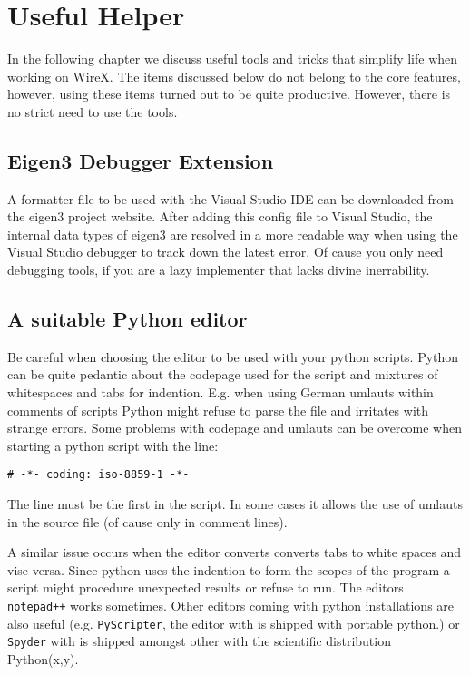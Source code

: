 \documentclass[11pt,a4paper,onepage,openany]{book}
\begin{document}
\chapter{Useful Helper}
In the following chapter we discuss useful tools and tricks that simplify life
when working on WireX. The items discussed below do not belong to the core
features, however, using these items turned out to be quite productive.
However, there is no strict need to use the tools.

\section{Eigen3 Debugger Extension}
A formatter file to be used with the Visual Studio IDE can be downloaded from
the eigen3 project website. After adding this config file to Visual Studio, the
internal data types of eigen3 are resolved in a more readable way when using
the Visual Studio debugger to track down the latest error. Of cause you only
need debugging tools, if you are a lazy implementer that lacks divine
inerrability.

\section{A suitable Python editor}
Be careful when choosing the editor to be used with your python scripts. Python
can be quite pedantic about the codepage used for the script and mixtures of
whitespaces and tabs for indention. E.g. when using German umlauts within
comments of scripts Python might refuse to parse the file and irritates with
strange errors. Some problems with codepage and umlauts can be overcome when
starting a python script with the line:
\begin{verbatim}
# -*- coding: iso-8859-1 -*-
\end{verbatim}
The line must be the first in the script. In some cases it allows the use of
umlauts in the source file (of cause only in comment lines).

A similar issue occurs when the editor converts converts tabs to white spaces
and vise versa. Since python uses the indention to form the scopes of the
program a script might procedure unexpected results or refuse to run. The
editors \texttt{notepad++} works sometimes. Other editors coming with python
installations are also useful (e.g. \texttt{PyScripter}, the editor with is
shipped with portable python.) or \texttt{Spyder} with is shipped amongst
other with the scientific distribution Python(x,y).
\end{document}
